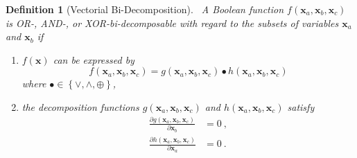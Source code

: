 \documentclass[12pt]{toptesi}
\newcommand\bx{\mathbf{x}}
\newtheorem{definition}{Definition}
\begin{document}
\begin{definition}[Vectorial Bi-Decomposition]$\, $
\label{def:vbd}
\newline
A Boolean function $f(\bx_a,\bx_b,\bx_c)$
is OR-, AND-, or XOR-bi-decomposable with regard to the subsets of variables $\bx_a$ and $\bx_b$  
if 
\begin{enumerate}
	\item $f(\bx)$ can be expressed by
\begin{equation}
f(\bx_a,\bx_b,\bx_c)=g(\bx_a,\bx_b,\bx_c) \bullet h(\bx_a,\bx_b,\bx_c)
 \label{equ:def_vobd}
\end{equation}
where $\bullet \in \left\{ \vee, \wedge, \oplus \right\}$,
	\item the decomposition functions 
$g(\bx_a,\bx_b,\bx_c)$ and $h(\bx_a,\bx_b,\bx_c)$ satisfy 
\begin{align}
\frac{\partial g(\bx_a,\bx_b,\bx_c)}{\partial \bx_b} &= 0~,
 \label{equ:prop_vbdg}
\\
\frac{\partial h(\bx_a,\bx_b,\bx_c)}{\partial \bx_a} &= 0~.
 \label{equ:prop_vbdh}
\end{align}
\end{enumerate}
\end{definition}
\end{document}
